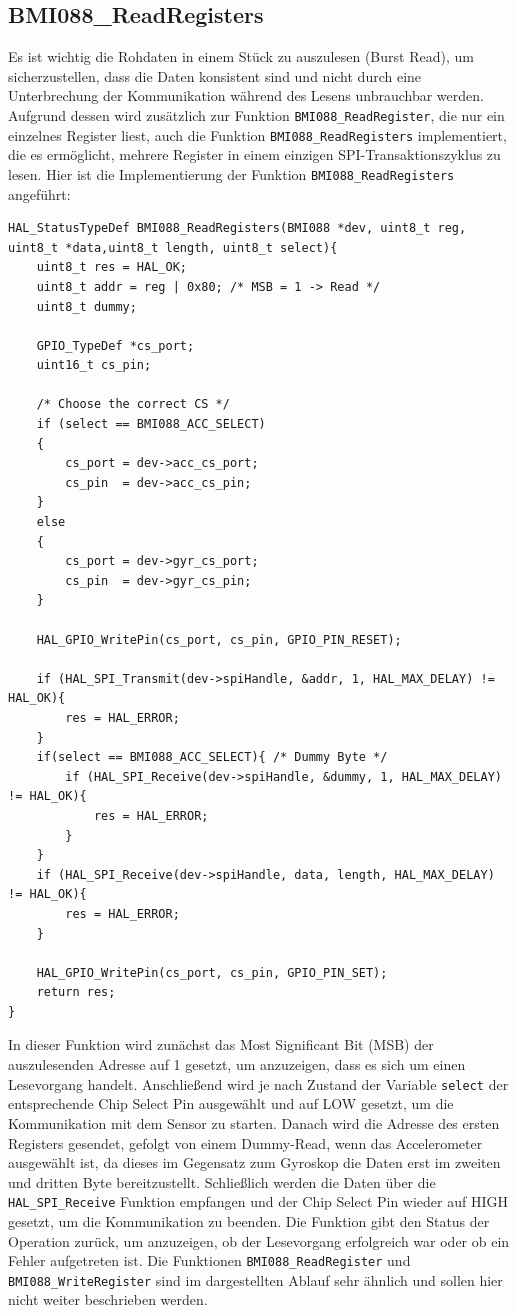 \subsection{BMI088\_ReadRegisters}
\label{subsec:readgister}
Es ist wichtig die Rohdaten in einem Stück zu auszulesen (Burst Read), um sicherzustellen, dass die Daten konsistent sind und nicht durch eine Unterbrechung der Kommunikation während des Lesens unbrauchbar werden. 
Aufgrund dessen wird zusätzlich zur Funktion \texttt{BMI088\_ReadRegister}, die nur ein einzelnes Register liest, auch die Funktion \texttt{BMI088\_ReadRegisters} implementiert, die es ermöglicht, mehrere Register in einem einzigen SPI-Transaktionszyklus zu lesen. Hier ist die Implementierung der Funktion \texttt{BMI088\_ReadRegisters} angeführt:
\begin{lstlisting}[style=cstyle, caption={Register lesen}, label={lst:read_registers}]
HAL_StatusTypeDef BMI088_ReadRegisters(BMI088 *dev, uint8_t reg, uint8_t *data,uint8_t length, uint8_t select){
    uint8_t res = HAL_OK;
    uint8_t addr = reg | 0x80; /* MSB = 1 -> Read */
    uint8_t dummy;

    GPIO_TypeDef *cs_port;
    uint16_t cs_pin;

    /* Choose the correct CS */
    if (select == BMI088_ACC_SELECT)
    {
        cs_port = dev->acc_cs_port;
        cs_pin  = dev->acc_cs_pin;
    }
    else
    {
        cs_port = dev->gyr_cs_port;
        cs_pin  = dev->gyr_cs_pin;
    }

    HAL_GPIO_WritePin(cs_port, cs_pin, GPIO_PIN_RESET);

    if (HAL_SPI_Transmit(dev->spiHandle, &addr, 1, HAL_MAX_DELAY) != HAL_OK){
        res = HAL_ERROR;
    }
    if(select == BMI088_ACC_SELECT){ /* Dummy Byte */
    	if (HAL_SPI_Receive(dev->spiHandle, &dummy, 1, HAL_MAX_DELAY) != HAL_OK){
    		res = HAL_ERROR;
    	}
    }
    if (HAL_SPI_Receive(dev->spiHandle, data, length, HAL_MAX_DELAY) != HAL_OK){
    	res = HAL_ERROR;
    }

    HAL_GPIO_WritePin(cs_port, cs_pin, GPIO_PIN_SET);
    return res;
}
\end{lstlisting}
In dieser Funktion wird zunächst das Most Significant Bit (MSB) der auszulesenden Adresse auf 1 gesetzt, um anzuzeigen, dass es sich um einen Lesevorgang handelt. Anschließend wird je nach Zustand der Variable \texttt{select} der entsprechende Chip Select Pin ausgewählt und auf LOW gesetzt, um die Kommunikation mit dem Sensor zu starten. Danach wird die Adresse des ersten Registers gesendet, gefolgt von einem Dummy-Read, wenn das Accelerometer ausgewählt ist, da dieses im Gegensatz zum Gyroskop die Daten erst im zweiten und dritten Byte bereitzustellt. Schließlich werden die Daten über die \texttt{HAL\_SPI\_Receive} Funktion empfangen und der Chip Select Pin wieder auf HIGH gesetzt, um die Kommunikation zu beenden. Die Funktion gibt den Status der Operation zurück, um anzuzeigen, ob der Lesevorgang erfolgreich war oder ob ein Fehler aufgetreten ist.
Die Funktionen \texttt{BMI088\_ReadRegister} und \texttt{BMI088\_WriteRegister} sind im dargestellten Ablauf sehr ähnlich und sollen hier nicht weiter beschrieben werden.
